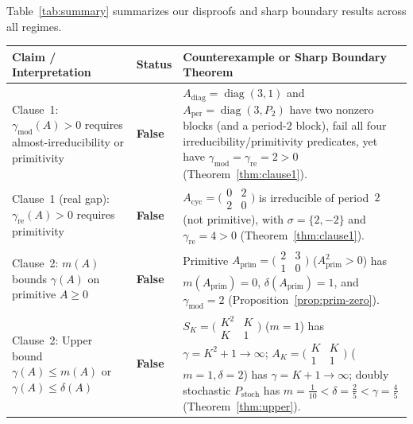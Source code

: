\documentclass[11pt]{article}
\theoremstyle{definition}
\DeclareMathOperator{\diag}{diag}
\begin{document}
Table~\ref{tab:summary} summarizes our disproofs and sharp boundary results across all regimes.

\begin{table}[ht]
\centering
\small
\begin{tabular}{@{}p{}p{}p{}@{}}
\toprule
\textbf{Claim / Interpretation} & \textbf{Status} & \textbf{Counterexample or Sharp Boundary Theorem} \\
\midrule
Clause~1: $\gamma_{\mathrm{mod}}(A) > 0$ requires almost-irreducibility or primitivity & \textbf{False} & $A_{\mathrm{diag}} = \diag(3,1)$ and $A_{\mathrm{per}} = \diag(3, P_2)$ have two nonzero blocks (and a period-$2$ block), fail all four irreducibility/primitivity predicates, yet have $\gamma_{\mathrm{mod}} = \gamma_{\mathrm{re}} = 2 > 0$ (Theorem~\ref{thm:clause1}). \\
\addlinespace[3pt]
Clause~1 (real gap): $\gamma_{\mathrm{re}}(A) > 0$ requires primitivity & \textbf{False} & $A_{\mathrm{cyc}} = \bigl(\begin{smallmatrix}0&2\\2&0\end{smallmatrix}\bigr)$ is irreducible of period~$2$ (not primitive), with $\sigma = \{2,-2\}$ and $\gamma_{\mathrm{re}} = 4 > 0$ (Theorem~\ref{thm:clause1}). \\
\addlinespace[3pt]
Clause~2: $m(A)$ bounds $\gamma(A)$ on primitive $A \ge 0$ & \textbf{False} & Primitive $A_{\mathrm{prim}} = \bigl(\begin{smallmatrix}2&3\\1&0\end{smallmatrix}\bigr)$ ($A_{\mathrm{prim}}^2 > 0$) has $m(A_{\mathrm{prim}}) = 0$, $\delta(A_{\mathrm{prim}}) = 1$, and $\gamma_{\mathrm{mod}} = 2$ (Proposition~\ref{prop:prim-zero}). \\
\addlinespace[3pt]
Clause~2: Upper bound $\gamma(A) \le m(A)$ or $\gamma(A) \le \delta(A)$ & \textbf{False} & $S_K = \bigl(\begin{smallmatrix}K^2&K\\K&1\end{smallmatrix}\bigr)$ ($m=1$) has $\gamma = K^2+1 \to \infty$; $A_K = \bigl(\begin{smallmatrix}K&K\\1&1\end{smallmatrix}\bigr)$ ($m=1,\delta=2$) has $\gamma = K+1 \to \infty$; doubly stochastic $P_{\mathrm{stoch}}$ has $m = \frac{1}{10} < \delta = \frac{2}{5} < \gamma = \frac{4}{5}$ (Theorem~\ref{thm:upper}). \\

\end{tabular}
\end{table}
\end{document}
